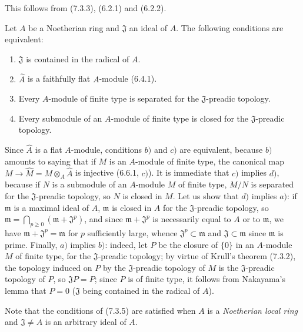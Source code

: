This follows from (7.3.3), (6.2.1) and (6.2.2).

\begin{corollary}[7.3.5]
\label{0.7.3.5}
Let $A$ be a Noetherian ring and $\mathfrak J$ an ideal of $A$. The
following conditions are equivalent:
\begin{enumerate}
  \item[$a)$] $\mathfrak J$ is contained in the radical of $A$.
  \item[$b)$] $\widehat A$ is a faithfully flat $A$-module \textup{(6.4.1)}.
  \item[$c)$] Every $A$-module of finite type is separated for the
  $\mathfrak J$-preadic topology.
  \item[$d)$] Every submodule of an $A$-module of finite type is closed for the
  $\mathfrak J$-preadic topology.
\end{enumerate}
\end{corollary}

Since $\widehat A$ is a flat $A$-module, conditions $b)$ and $c)$ are
equivalent, because $b)$ amounts to saying that if $M$ is an $A$-module of finite
type, the canonical map
$M\to\widehat M=M\otimes_A\widehat A$ is injective (6.6.1, $c)$). It is
immediate that $c)$ implies $d)$, because if $N$ is a submodule of an $A$-module
$M$ of finite type, $M/N$ is separated for the $\mathfrak J$-preadic topology,
so $N$ is closed in $M$. Let us show that $d)$ implies $a)$: if
$\mathfrak m$ is a maximal ideal of $A$, $\mathfrak m$ is closed in $A$
for the $\mathfrak J$-preadic topology, so $\mathfrak m=\bigcap_{p\geq0}(\mathfrak m+\mathfrak J^p)$,
and since $\mathfrak m+\mathfrak J^p$ is necessarily equal to $A$ or to
$\mathfrak m$, we have $\mathfrak m+\mathfrak J^p=\mathfrak m$ for $p$ sufficiently
large, whence $\mathfrak J^p\subset\mathfrak m$ and
$\mathfrak J\subset\mathfrak m$ since $\mathfrak m$ is prime. Finally,
$a)$ implies $b)$: indeed, let $P$ be the closure of $\{0\}$ in an
$A$-module $M$ of finite type, for the $\mathfrak J$-preadic topology; by
virtue of Krull's theorem (7.3.2), the topology induced on $P$ by the
$\mathfrak J$-preadic topology of $M$ is the $\mathfrak J$-preadic topology of
$P$, so $\mathfrak JP=P$; since $P$ is of finite type, it follows from Nakayama's
lemma that $P=0$ ($\mathfrak J$ being contained in the radical of $A$).

Note that the conditions of (7.3.5) are satisfied when $A$ is a
\emph{Noetherian local ring} and $\mathfrak J\neq A$ is an arbitrary ideal of
$A$.


